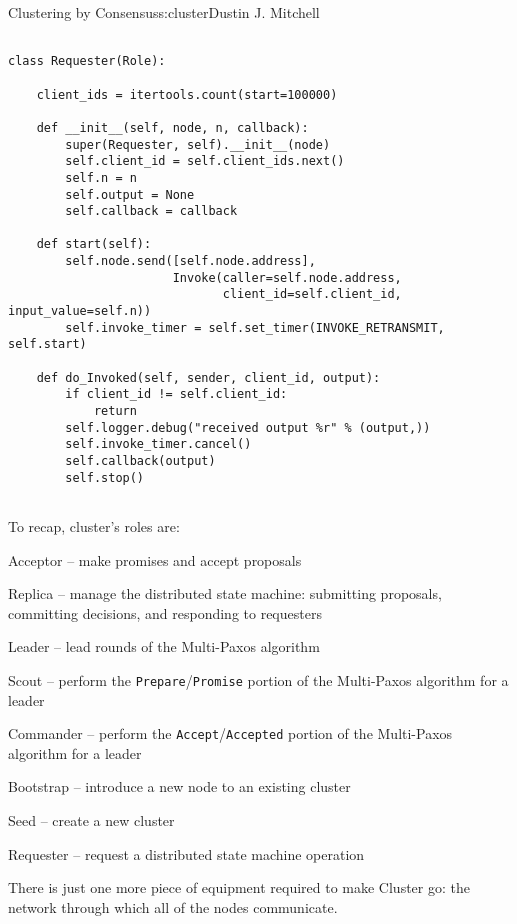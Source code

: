 \begin{aosachapter}{Clustering by Consensus}{s:cluster}{Dustin J. Mitchell}
\begin{verbatim}

class Requester(Role):

    client_ids = itertools.count(start=100000)

    def __init__(self, node, n, callback):
        super(Requester, self).__init__(node)
        self.client_id = self.client_ids.next()
        self.n = n
        self.output = None
        self.callback = callback

    def start(self):
        self.node.send([self.node.address], 
                       Invoke(caller=self.node.address, 
                              client_id=self.client_id, input_value=self.n))
        self.invoke_timer = self.set_timer(INVOKE_RETRANSMIT, self.start)

    def do_Invoked(self, sender, client_id, output):
        if client_id != self.client_id:
            return
        self.logger.debug("received output %r" % (output,))
        self.invoke_timer.cancel()
        self.callback(output)
        self.stop()
    
\end{verbatim}

\label{summary}

To recap, cluster's roles are:

\begin{aosaitemize}

\item
  Acceptor -- make promises and accept proposals
\item
  Replica -- manage the distributed state machine: submitting proposals,
  committing decisions, and responding to requesters
\item
  Leader -- lead rounds of the Multi-Paxos algorithm
\item
  Scout -- perform the \texttt{Prepare}/\texttt{Promise} portion of the
  Multi-Paxos algorithm for a leader
\item
  Commander -- perform the \texttt{Accept}/\texttt{Accepted} portion of
  the Multi-Paxos algorithm for a leader
\item
  Bootstrap -- introduce a new node to an existing cluster
\item
  Seed -- create a new cluster
\item
  Requester -- request a distributed state machine operation
\end{aosaitemize}

There is just one more piece of equipment required to make Cluster go:
the network through which all of the nodes communicate.


\end{aosachapter}
